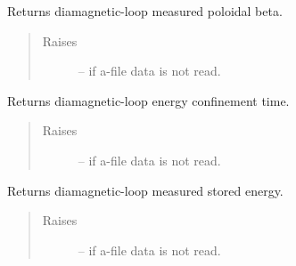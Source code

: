 \documentclass[letterpaper,10pt,english]{sphinxmanual}
\begin{document}
\begin{fulllineitems}
\begin{fulllineitems}
\begin{quote}
\begin{description}
\end{description}\end{quote}

\end{fulllineitems}


\begin{fulllineitems}
\label{eqtools:eqtools.eqdskreader.EqdskReader.getDiamagBetaP}
Returns diamagnetic-loop measured poloidal beta.
\begin{quote}\begin{description}
\item[{Raises}] \leavevmode
{} -- 
if a-file data is not read.

\end{description}\end{quote}

\end{fulllineitems}


\begin{fulllineitems}
\label{eqtools:eqtools.eqdskreader.EqdskReader.getDiamagTauE}
Returns diamagnetic-loop energy confinement time.
\begin{quote}\begin{description}
\item[{Raises}] \leavevmode
{} -- 
if a-file data is not read.

\end{description}\end{quote}

\end{fulllineitems}


\begin{fulllineitems}
\label{eqtools:eqtools.eqdskreader.EqdskReader.getDiamagWp}
Returns diamagnetic-loop measured stored energy.
\begin{quote}\begin{description}
\item[{Raises}] \leavevmode
{} -- 
if a-file data is not read.

\end{description}\end{quote}


\end{fulllineitems}
\end{fulllineitems}
\end{document}
